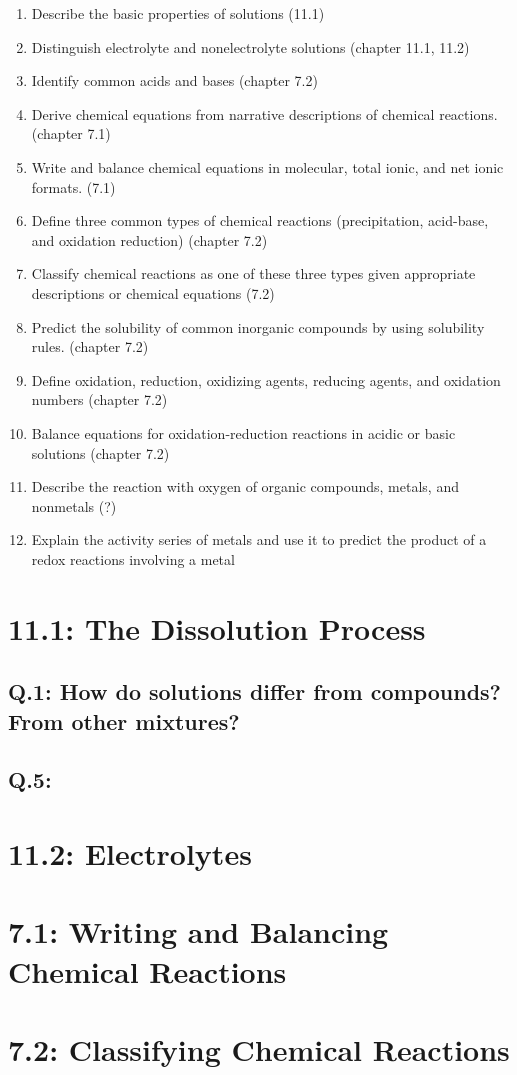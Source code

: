 \documentclass[11pt, letterpaper]{article}
\begin{document}
\begin{enumerate}
	\item Describe the basic properties of solutions (11.1)
	\item Distinguish electrolyte and nonelectrolyte solutions (chapter 11.1, 11.2)
	\item Identify common acids and bases (chapter 7.2)
	\item Derive chemical equations from narrative descriptions of chemical reactions.(chapter 7.1)
	\item Write and balance chemical equations in molecular, total ionic, and net ionic formats. (7.1)
	\item Define three common types of chemical reactions (precipitation, acid-base, and oxidation reduction) (chapter 7.2)
	\item Classify chemical reactions as one of these three types given appropriate descriptions or chemical equations (7.2)
	\item Predict the solubility of common inorganic compounds by using solubility rules. (chapter 7.2)
	\item Define oxidation, reduction, oxidizing agents, reducing agents, and oxidation numbers (chapter 7.2)
	\item Balance equations for oxidation-reduction reactions in acidic or basic solutions (chapter 7.2)
	\item Describe the reaction with oxygen of organic compounds, metals, and nonmetals (?)
	\item Explain the activity series of metals and use it to predict the product of a redox reactions involving a metal
\end{enumerate}



\section*{11.1: The Dissolution Process}

\subsection*{Q.1: How do solutions differ from compounds? From other mixtures?}

\subsection*{Q.5: }

\section*{11.2: Electrolytes}


\section*{7.1: Writing and Balancing Chemical Reactions}


\section*{7.2: Classifying Chemical Reactions}
\end{document}
